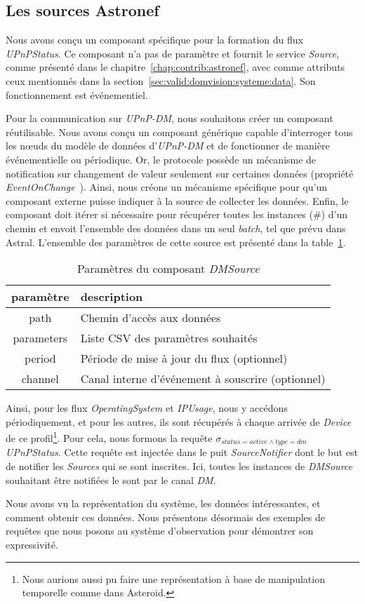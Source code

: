 \subsection{Les sources Astronef}
Nous avons conçu un composant spécifique pour la formation du flux \textit{UPnPStatus}. Ce composant n'a pas de paramètre et fournit le service \textit{Source}, comme présenté dans le chapitre~\ref{chap:contrib:astronef}, avec comme attributs ceux mentionnés dans la section~\ref{sec:valid:domvision:systeme:data}. Son fonctionnement est événementiel.

Pour la communication sur \textit{UPnP-DM}, nous souhaitons créer un composant réutilisable. Nous avons conçu un composant générique capable d'interroger tous les nœuds du modèle de données d'\textit{UPnP-DM} et de fonctionner de manière événementielle ou périodique. Or, le protocole possède un mécanisme de notification sur changement de valeur seulement sur certaines données (propriété \textit{EventOnChange}~\cite{UPnP:DM2}). Ainsi, nous créons un mécanisme spécifique pour qu'un composant externe puisse indiquer à la source de collecter les données. Enfin, le composant doit itérer si nécessaire pour récupérer toutes les instances (\#) d'un chemin et envoit l'ensemble des données dans un seul \textit{batch}, tel que prévu dans Astral. L'ensemble des paramètres de cette source est présenté dans la table~\ref{tab:valid:domvision:dmsource}.

\begin{table}[ht]
    \centering
    \begin{tabular}{cl}
        paramètre & description \\ \midrule
        path & Chemin d'accès aux données \\
        parameters & Liste CSV des paramètres souhaités \\
        period & Période de mise à jour du flux (optionnel) \\
        channel & Canal interne d'événement à souscrire (optionnel)
    \end{tabular}
    \caption{Paramètres du composant \textit{DMSource}}\label{tab:valid:domvision:dmsource}
\end{table}

Ainsi, pour les flux \textit{OperatingSystem} et \textit{IPUsage}, nous y accédons périodiquement, et pour les autres, ils sont récupérés à chaque arrivée de \textit{Device} de ce profil\footnote{Nous aurions aussi pu faire une représentation à base de manipulation temporelle comme dans Asteroid.}. Pour cela, nous formons la requête $\sigma_{status=active\wedge type=dm}$ \textit{UPnPStatus}. Cette requête est injectée dans le puit \textit{SourceNotifier} dont le but est de notifier les \textit{Sources} qui se sont inscrites. Ici, toutes les instances de \textit{DMSource} souhaitant être notifiées le sont par le canal \textit{DM}.

Nous avons vu la représentation du système, les données intéressantes, et comment obtenir ces données. Nous présentons désormais des exemples de requêtes que nous posons au système d'observation pour démontrer son expressivité.

